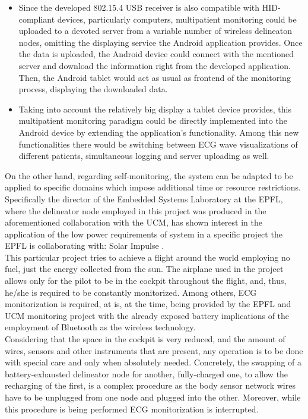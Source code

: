 \begin{itemize}
				\begin{itemize}
					\item Since the developed 802.15.4 USB receiver is also compatible with HID-compliant
						devices, particularly computers, multipatient monitoring could be uploaded to a
						devoted server from a variable number of wireless delineaton nodes, omitting the 
						displaying service the Android application provides. Once the data is uploaded,
						the Android device could connect with the mentioned server and download the information
						right from the developed application. Then, the Android tablet would act as usual
						as frontend of the monitoring process, displaying the downloaded data.

					\item Taking into account the relatively big display a tablet device provides, this
						multipatient monitoring paradigm could be directly implemented into the Android 
						device by extending the application's functionality. Among this new functionalities
						there would be switching between ECG wave visualizations of different patients,
						simultaneous logging and server uploading as well.
				\end{itemize}

				On the other hand, regarding self-monitoring, the system can be adapted to be applied to 
				specific domains which impose additional time or resource restrictions.
				Specifically the director of the Embedded Systems Laboratory at the EPFL, where the delineator 
				node employed in this project was produced in the aforementioned collaboration with the UCM, 
				has shown interest in the application of the low power requirements of system in a specific project
				the EPFL is collaborating with: Solar Impulse \cite{solarflight}.\\

				This particular project tries to achieve a flight around the world employing no fuel, just the
				energy collected from the sun. The airplane used in the project allows only for the pilot to be
				in the cockpit throughout the flight, and, thus, he/she is required to be constantly monitorized.
				Among others, ECG monitorization is required, at is, at the time, being provided by the EPFL and
				UCM monitoring project with the already exposed battery implications of the employment of 
				Bluetooth as the wireless technology.\\

				Considering that the space in the cockpit is very reduced, and the amount of wires, sensors and
				other instruments that are present, any operation is to be done with special care and only when
				absolutely needed. Concretely, the swapping of a battery-exhausted delineator node for another,
				fully-charged one, to allow the recharging of the first, is a complex procedure as the body
				sensor network wires have to be unplugged from one node and plugged into the other. Moreover,
				while this procedure is being performed ECG monitorization is interrupted.\\


\end{itemize}
